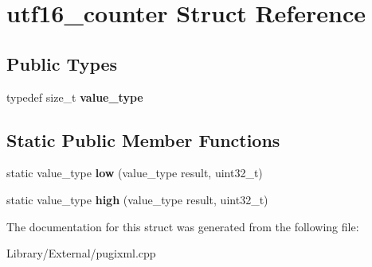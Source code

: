 \hypertarget{structutf16__counter}{}\section{utf16\+\_\+counter Struct Reference}
\label{structutf16__counter}
\subsection*{Public Types}
\begin{DoxyCompactItemize}
\item 
\hypertarget{structutf16__counter_a0d63f9ca809d182b2f184ef93bd11107}{}typedef size\+\_\+t {\bfseries value\+\_\+type}\label{structutf16__counter_a0d63f9ca809d182b2f184ef93bd11107}

\end{DoxyCompactItemize}
\subsection*{Static Public Member Functions}
\begin{DoxyCompactItemize}
\item 
\hypertarget{structutf16__counter_a4571f3d0fbf0ce763904ec3321dcb41e}{}static value\+\_\+type {\bfseries low} (value\+\_\+type result, uint32\+\_\+t)\label{structutf16__counter_a4571f3d0fbf0ce763904ec3321dcb41e}

\item 
\hypertarget{structutf16__counter_ac1a8793996e57dc28fd22f3165628e4d}{}static value\+\_\+type {\bfseries high} (value\+\_\+type result, uint32\+\_\+t)\label{structutf16__counter_ac1a8793996e57dc28fd22f3165628e4d}

\end{DoxyCompactItemize}


The documentation for this struct was generated from the following file\+:\begin{DoxyCompactItemize}
\item 
Library/\+External/pugixml.\+cpp\end{DoxyCompactItemize}
